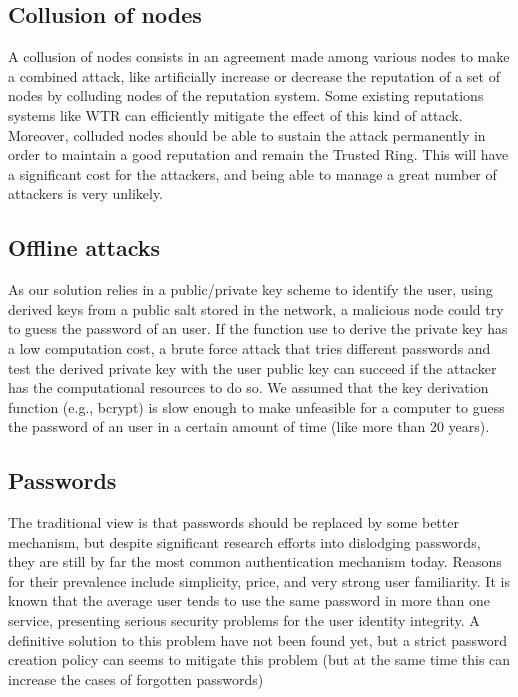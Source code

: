 \subsection{Collusion of nodes}

A collusion of nodes consists in an agreement made among various nodes to make
a combined attack, like artificially increase or decrease the reputation of a
set of nodes by colluding nodes of the reputation system. Some existing
reputations systems like WTR can efficiently mitigate the effect of this kind
of attack. Moreover, colluded nodes should be able to sustain the attack
permanently in order to maintain a good reputation and remain the Trusted Ring.
This will have a significant cost for the attackers, and being able to manage a
great number of attackers is very unlikely. 

\subsection{Offline attacks}
As our solution relies in a public/private key scheme to identify the user,
using derived keys from a public salt stored in the network, a malicious node
could try to guess the password of an user. If the function use to derive the
private key has a low computation cost, a brute force attack that tries
different passwords and test the derived private key with the user public key
can succeed if the attacker has the computational resources to do so. We
assumed that the key derivation function (e.g., bcrypt) is slow enough to make
unfeasible for a computer to guess the password of an user in a certain
amount of time (like more than 20 years).

\subsection{Passwords}
The traditional view is that passwords should be replaced by some better
mechanism, but despite significant research efforts into dislodging passwords,
they are still by far the most common authentication mechanism today.
Reasons for their prevalence include simplicity, price, and very strong user
familiarity.
It is known that the average user tends to use the
same password in more than one service, presenting serious security problems
for the user identity integrity. A definitive solution to this problem have not
been found yet, but a strict password creation policy can seems to mitigate this
problem (but at the same time this can increase the cases of forgotten passwords)

